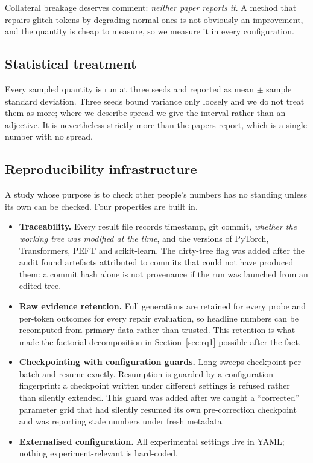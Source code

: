 \documentclass[11pt,a4paper]{article}
\begin{document}
Collateral breakage deserves comment: \emph{neither paper reports it}. A method
that repairs glitch tokens by degrading normal ones is not obviously an
improvement, and the quantity is cheap to measure, so we measure it in every
configuration.

\subsection{Statistical treatment}

Every sampled quantity is run at three seeds and reported as mean $\pm$ sample
standard deviation. Three seeds bound variance only loosely and we do not treat
them as more; where we describe spread we give the interval rather than an
adjective. It is nevertheless strictly more than the papers report, which is a
single number with no spread.

\subsection{Reproducibility infrastructure}

A study whose purpose is to check other people's numbers has no standing unless
its own can be checked. Four properties are built in.

\begin{itemize}[leftmargin=*]
\item \textbf{Traceability.} Every result file records timestamp, git commit,
\emph{whether the working tree was modified at the time}, and the versions of
PyTorch, Transformers, PEFT and scikit-learn. The dirty-tree flag was added after
the audit found artefacts attributed to commits that could not have produced them:
a commit hash alone is not provenance if the run was launched from an edited tree.
\item \textbf{Raw evidence retention.} Full generations are retained for every
probe and per-token outcomes for every repair evaluation, so headline numbers can
be recomputed from primary data rather than trusted. This retention is what made
the factorial decomposition in Section~\ref{sec:rq1} possible after the fact.
\item \textbf{Checkpointing with configuration guards.} Long sweeps checkpoint per
batch and resume exactly. Resumption is guarded by a configuration fingerprint: a
checkpoint written under different settings is refused rather than silently
extended. This guard was added after we caught a ``corrected'' parameter grid that
had silently resumed its own pre-correction checkpoint and was reporting stale
numbers under fresh metadata.
\item \textbf{Externalised configuration.} All experimental settings live in YAML;
nothing experiment-relevant is hard-coded.
\end{itemize}
\end{document}
